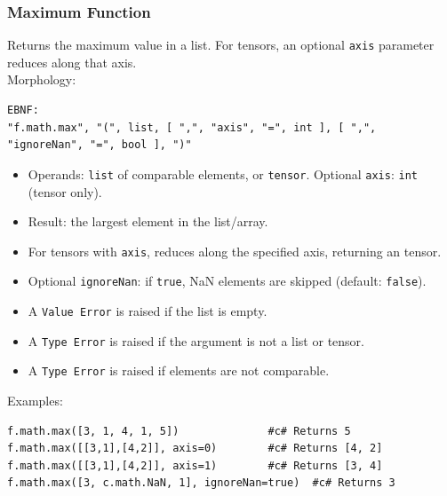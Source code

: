 \subsubsection{Maximum Function}
Returns the maximum value in a list. For tensors, an optional \texttt{axis} parameter reduces along that axis. \\
Morphology:
\begin{verbatim}
EBNF:
"f.math.max", "(", list, [ ",", "axis", "=", int ], [ ",", "ignoreNan", "=", bool ], ")"
\end{verbatim}
\begin{itemize}
\item Operands: \texttt{list} of comparable elements, or \texttt{tensor}. Optional \texttt{axis}: \texttt{int} (tensor only).
\item Result: the largest element in the list/array.
\item For tensors with \texttt{axis}, reduces along the specified axis, returning an tensor.
\item Optional \texttt{ignoreNan}: if \texttt{true}, NaN elements are skipped (default: \texttt{false}).
\item A \texttt{Value Error} is raised if the list is empty.
\item A \texttt{Type Error} is raised if the argument is not a list or tensor.
\item A \texttt{Type Error} is raised if elements are not comparable.
\end{itemize}
Examples:
\begin{verbatim}
f.math.max([3, 1, 4, 1, 5])              #c# Returns 5
f.math.max([[3,1],[4,2]], axis=0)        #c# Returns [4, 2]
f.math.max([[3,1],[4,2]], axis=1)        #c# Returns [3, 4]
f.math.max([3, c.math.NaN, 1], ignoreNan=true)  #c# Returns 3
\end{verbatim}

